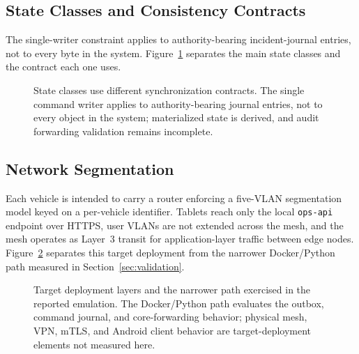 \subsection{State Classes and Consistency Contracts}
\label{sec:state-taxonomy}

The single-writer constraint applies to authority-bearing incident-journal entries, not to every byte in the system. Figure~\ref{fig:state-contracts} separates the main state classes and the contract each one uses.

\begin{figure}[t]
\centering

\caption{State classes use different synchronization contracts. The single command writer applies to authority-bearing journal entries, not to every object in the system; materialized state is derived, and audit forwarding validation remains incomplete.}
\label{fig:state-contracts}
\end{figure}

\subsection{Network Segmentation}

Each vehicle is intended to carry a router enforcing a five-VLAN segmentation model keyed on a per-vehicle identifier. Tablets reach only the local \texttt{ops-api} endpoint over HTTPS, user VLANs are not extended across the mesh, and the mesh operates as Layer~3 transit for application-layer traffic between edge nodes. Figure~\ref{fig:topology-scope} separates this target deployment from the narrower Docker/Python path measured in Section~\ref{sec:validation}.

\begin{figure}[t]
\centering

\caption{Target deployment layers and the narrower path exercised in the reported emulation. The Docker/Python path evaluates the outbox, command journal, and core-forwarding behavior; physical mesh, VPN, mTLS, and Android client behavior are target-deployment elements not measured here.}
\label{fig:topology-scope}
\end{figure}
